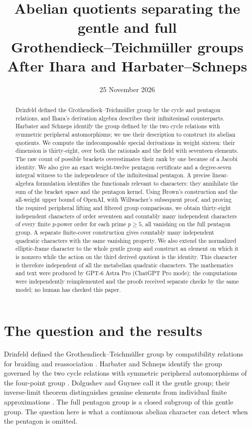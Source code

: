 \documentclass[11pt]{article}
\title{Abelian quotients separating the gentle and full\\Grothendieck--Teichm\"uller groups\\
\large After Ihara and Harbater--Schneps}
\author{}
\date{25 November 2026}
\theoremstyle{definition}
\theoremstyle{remark}
\begin{document}
\maketitle
\begin{abstract}
Drinfeld defined the Grothendieck--Teichm\"uller group by the cycle and pentagon relations, and Ihara's derivation algebra describes their infinitesimal counterparts. Harbater and Schneps identify the group defined by the two cycle relations with symmetric peripheral automorphisms; we use their description to construct its abelian quotients. We compute the indecomposable special derivations in
weight sixteen: their dimension is thirty-eight, over both the rationals
and the field with seventeen elements.  The raw count of possible brackets
overestimates their rank by one because of a Jacobi identity.  We also give
an exact weight-twelve pentagon certificate and a degree-seven integral
witness to the independence of the infinitesimal pentagon.  A precise
linear-algebra formulation identifies the functionals relevant to
characters: they annihilate the sum of the bracket space and the pentagon
kernel.  Using Brown's construction and the all-weight upper bound of OpenAI,
with Willwacher's subsequent proof,
and proving the required peripheral lifting and filtered group comparisons,
we obtain thirty-eight independent characters of order seventeen and
countably many independent characters of every finite $p$-power order
for each prime $p\geq5$, all vanishing on the full pentagon group.
A separate finite-cover construction gives countably many independent
quadratic characters with the same vanishing property.
We also extend the normalized elliptic-frame character to the whole
gentle group and construct an element on which it is nonzero while
the action on the third derived quotient is the identity. This character
is therefore independent of all the metabelian quadratic characters.
The mathematics
and text were produced by GPT-6 Astra Pro (ChatGPT Pro mode); the computations
were independently reimplemented and the proofs received separate checks
by the same model; no human has checked this paper.
\end{abstract}

\section{The question and the results}
Drinfeld defined the Grothendieck--Teichm\"uller group by compatibility
relations for braiding and reassociation \cite[\S5]{Drinfeld}.
Harbater and Schneps identify the group governed by the two cycle relations
with symmetric peripheral automorphisms of the four-point group
\cite[Main Theorem]{HS}.  Dolgushev and Guynee call it the gentle group;
their inverse-limit theorem distinguishes genuine elements from individual
finite approximations \cite[Definition 2.5, Theorem 5.2, Corollary 5.4]{DG}.
The full pentagon group is a closed subgroup of this gentle group.
The question here is what a continuous abelian character can detect when
the pentagon is omitted.
\end{document}
